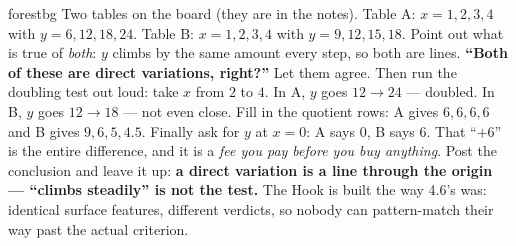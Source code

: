 \documentclass[10pt]{article}
\begin{document}
\begin{skillbox}[Hook]{forestbg}
    Two tables on the board (they are in the notes). Table A: $x=1,2,3,4$ with $y=6,12,18,24$. Table B:
    $x=1,2,3,4$ with $y=9,12,15,18$. Point out what is true of \emph{both}: $y$ climbs by the same
    amount every step, so both are lines. \textbf{``Both of these are direct variations, right?''} Let
    them agree. Then run the doubling test out loud: take $x$ from $2$ to $4$. In A, $y$ goes
    $12\to24$ --- doubled. In B, $y$ goes $12\to18$ --- not even close. Fill in the quotient rows: A
    gives $6,6,6,6$ and B gives $9,6,5,4.5$. Finally ask for $y$ at $x=0$: A says $0$, B says $6$. That
    ``$+6$'' is the entire difference, and it is a \emph{fee you pay before you buy anything}. Post the
    conclusion and leave it up: \textbf{a direct variation is a line through the origin --- ``climbs
    steadily'' is not the test.} The Hook is built the way 4.6's was: identical surface features,
    different verdicts, so nobody can pattern-match their way past the actual criterion.
\end{skillbox}
\end{document}
